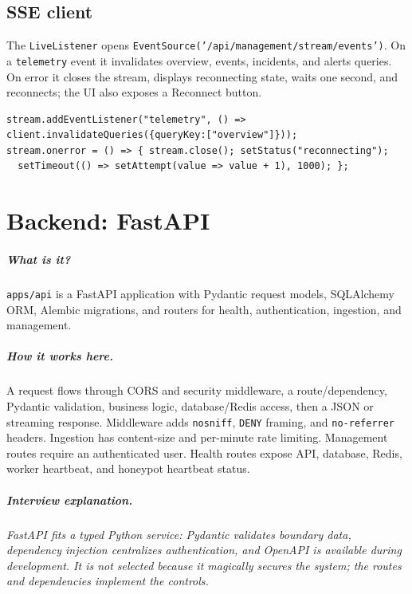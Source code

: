 \documentclass[11pt,oneside]{book}
\newcommand{\what}[1]{\paragraph{What is it?}#1}
\newcommand{\how}[1]{\paragraph{How it works here.}#1}
\newcommand{\interview}[1]{\paragraph{Interview explanation.}\emph{#1}}
\begin{document}
\section{SSE client}The \texttt{LiveListener} opens \texttt{EventSource('/api/management/stream/events')}. On a \texttt{telemetry} event it invalidates overview, events, incidents, and alerts queries. On error it closes the stream, displays reconnecting state, waits one second, and reconnects; the UI also exposes a Reconnect button.
\begin{lstlisting}[caption={Actual SSE client behavior, condensed from \texttt{live-listener.tsx}}]
stream.addEventListener("telemetry", () => client.invalidateQueries({queryKey:["overview"]}));
stream.onerror = () => { stream.close(); setStatus("reconnecting");
  setTimeout(() => setAttempt(value => value + 1), 1000); };
\end{lstlisting}

\chapter{Backend: FastAPI}
\what{\texttt{apps/api} is a FastAPI application with Pydantic request models, SQLAlchemy ORM, Alembic migrations, and routers for health, authentication, ingestion, and management.}
\how{A request flows through CORS and security middleware, a route/dependency, Pydantic validation, business logic, database/Redis access, then a JSON or streaming response. Middleware adds \texttt{nosniff}, \texttt{DENY} framing, and \texttt{no-referrer} headers. Ingestion has content-size and per-minute rate limiting. Management routes require an authenticated user. Health routes expose API, database, Redis, worker heartbeat, and honeypot heartbeat status.}
\interview{FastAPI fits a typed Python service: Pydantic validates boundary data, dependency injection centralizes authentication, and OpenAPI is available during development. It is not selected because it magically secures the system; the routes and dependencies implement the controls.}
\end{document}
